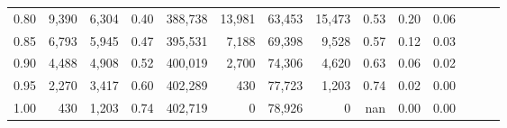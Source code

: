\begin{tabular}{rrrrrrrrrrrrrr}
0.80 &   9,390 &  6,304 &  0.40 &  388,738 &   13,981 &  63,453 &  15,473 &  0.53 &  0.20 &      0.06 \\
0.85 &   6,793 &  5,945 &  0.47 &  395,531 &    7,188 &  69,398 &   9,528 &  0.57 &  0.12 &      0.03 \\
0.90 &   4,488 &  4,908 &  0.52 &  400,019 &    2,700 &  74,306 &   4,620 &  0.63 &  0.06 &      0.02 \\
0.95 &   2,270 &  3,417 &  0.60 &  402,289 &      430 &  77,723 &   1,203 &  0.74 &  0.02 &      0.00 \\
1.00 &     430 &  1,203 &  0.74 &  402,719 &        0 &  78,926 &       0 &   nan &  0.00 &      0.00 \\
\bottomrule
\end{tabular}
